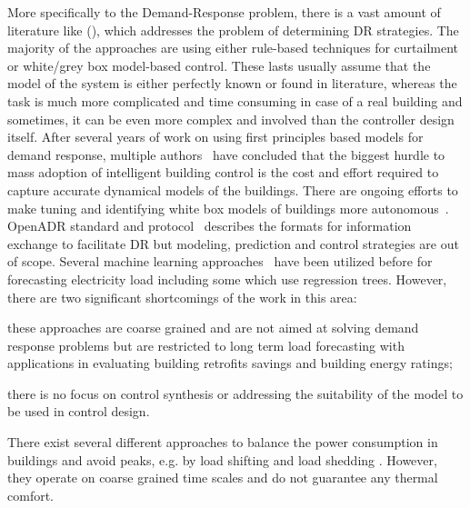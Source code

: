 \textcolor[rgb]{1.00,0.00,0.00}{More specifically to the Demand-Response problem, there is a vast amount of literature like (\cite{oldewurtel2013towards,xu2004peak}), which addresses the problem of determining DR strategies. The majority of the approaches are using either rule-based techniques for curtailment or white/grey box model-based control. These lasts usually assume that the model of the system is either perfectly known or found in literature, whereas the task is much more complicated and time consuming in case of a real building and sometimes, it can be even more complex and involved than the controller design itself. After several years of work on using first principles based models for demand response, multiple authors~\cite{costmpc,reallife} have concluded that the biggest hurdle to mass adoption of intelligent building control is the cost and effort required to capture accurate dynamical models of the buildings. There are ongoing efforts to make tuning and identifying white box models of buildings more autonomous~\cite{new2012autotune}. OpenADR standard and protocol~\cite{openadr} describes the formats for information exchange to facilitate DR but modeling, prediction and control strategies are out of scope. Several machine learning approaches~\cite{edwards2012predicting,vaghefi2014modeling,yin2012scalable} have been utilized before for forecasting electricity load including some which use regression trees. However, there are two significant shortcomings of the work in this area: 
	\begin{inparaenum}[(a)]
		\item these approaches are coarse grained and  are not aimed at solving demand response problems but are restricted to long term load forecasting with applications in evaluating building retrofits savings and building energy ratings; 
		\item  there is no focus on control synthesis or addressing the suitability of the model to be used in control design. 
	\end{inparaenum}
	There exist several different approaches to balance the power consumption in buildings and avoid peaks, e.g. by load shifting and load shedding \cite{KiliccoteEtAl06aca,LeeEtAl08dom}. However, they operate on coarse grained time scales and do not guarantee any thermal comfort.}

